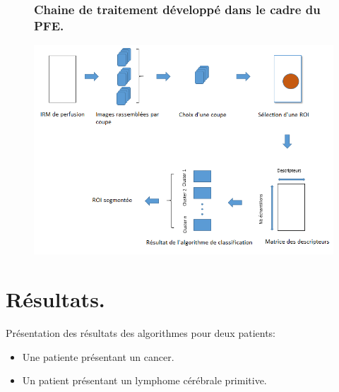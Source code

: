 \documentclass{beamer}
\begin{document}
\begin{frame}

\begin{figure}

\frametitle{Chaine de traitement développé dans le cadre du PFE.}
\centering
    \includegraphics[scale=0.5,angle=0]{Processing_toolchain.PNG}
    \label{fig:Chaine} 
    
\end{figure}

\end{frame}





\section{Résultats.}

\begin{frame}

Présentation des résultats des algorithmes pour deux patients:

\begin{itemize}
\item Une patiente présentant un cancer.
\item Un patient présentant un lymphome cérébrale primitive.
\end{itemize}



\end{frame}
\end{document}
